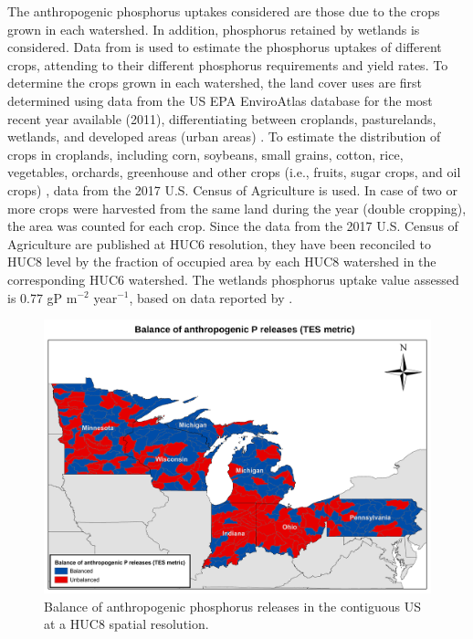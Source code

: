 \begin{refsection}[referencesCh4]
The anthropogenic phosphorus uptakes considered are those due to the crops grown in each watershed. In addition, phosphorus retained by wetlands is considered. Data from \citet{USDAHandbook} is used to estimate the phosphorus uptakes of different crops, attending to their different phosphorus requirements and yield rates. To determine the crops grown in each watershed, the land cover uses are first determined using data from the US EPA EnviroAtlas database for the most recent year available (2011), differentiating between croplands, pasturelands, wetlands, and developed areas (urban areas) \citep{EnviroAtlas}. To estimate the distribution of crops in croplands, including corn, soybeans, small grains, cotton, rice, vegetables, orchards, greenhouse and other crops (i.e., fruits, sugar crops, and oil crops) \citep{2017CensusofAgriculture}, data from the 2017 U.S. Census of Agriculture is used. In case of two or more crops were harvested from the same land during the year (double cropping), the area was counted for each crop. Since the data from the 2017 U.S. Census of Agriculture are published at HUC6 resolution, they have been reconciled to HUC8 level by the fraction of occupied area by each HUC8 watershed in the corresponding HUC6 watershed. The wetlands phosphorus uptake value assessed is 0.77 gP m$^{-2}$ year$^{-1}$, based on data reported by \citet{Kadlec}.

\begin{figure}[h]
	\centering
	\includegraphics[width=0.95\linewidth, trim={0cm 0cm 0cm 0cm},clip]{gfx/AppendixC/BalanceofP.pdf} 
	\caption{Balance of anthropogenic phosphorus releases in the contiguous US at a HUC8 spatial resolution.}
	\label{fig:TECmap_AppC}
\end{figure}


\end{refsection}
